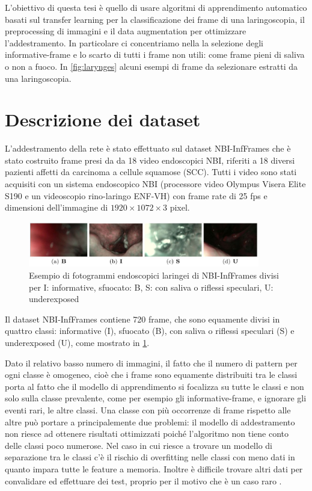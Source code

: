 L'obiettivo di questa tesi è quello di usare algoritmi di apprendimento automatico basati sul transfer learning per la classificazione dei frame di una laringoscopia, il  preprocessing di immagini e il data augmentation per ottimizzare l'addestramento. In particolare ci concentriamo nella la selezione degli informative-frame e lo scarto di tutti i frame non utili: come frame pieni di saliva o non a fuoco. In \cref{fig:larynges} alcuni esempi di frame da selezionare estratti da una laringoscopia.

\section{Descrizione dei dataset}\label{descrizione-dei-dataset}

L'addestramento della rete è stato effettuato  sul dataset
NBI-InfFrames  che
è stato costruito frame presi da da 18 video endoscopici NBI, riferiti a
18 diversi pazienti affetti da carcinoma a cellule squamose
(SCC). Tutti i video sono stati acquisiti con un sistema endoscopico
NBI (processore video Olympus Visera Elite S190 e
un videoscopio rino-laringo ENF-VH) con frame rate di
25 fps e dimensioni dell'immagine di \(1920\times 1072\times 3\) pixel.

\begin{figure}[ht]
    \centering
    \includegraphics[width=0.9\textwidth]{introduzione/Larynge.jpg}
    \caption[Esempio di fotogrammi endoscopici laringei di NBI-InfFrames]{Esempio di fotogrammi endoscopici laringei di NBI-InfFrames divisi per I: informative, sfuocato: B, S: con
    saliva o riflessi speculari,
    U: underexposed}
    \label{fig:larynges-2}
\end{figure}

Il dataset NBI-InfFrames contiene 720 frame, che sono equamente divisi in quattro classi: informative (I), sfuocato (B), con saliva o riflessi speculari (S) e underexposed  (U), come mostrato in \cref{fig:larynges-2}. 

Dato il relativo basso numero di immagini, il fatto che il numero di pattern per ogni classe è omogeneo, cioè che i frame sono equamente distribuiti tra le classi porta al fatto che il modello di apprendimento si focalizza su tutte le classi e non solo sulla classe prevalente, come per esempio gli informative-frame, e ignorare gli eventi rari, le altre classi.
Una classe con più occorrenze di frame rispetto alle altre può portare a principalemente due problemi: il modello di addestramento non riesce ad ottenere risultati ottimizzati  poiché l'algoritmo non tiene conto delle classi poco numerose. Nel caso in cui riesce a trovare un modello di separazione tra le classi c'è il rischio di overfitting nelle classi con meno dati in quanto impara tutte le feature a memoria. Inoltre è difficile trovare altri dati per convalidare ed effettuare dei test, proprio per il motivo che è un caso raro \cite{chatterjee_deep_2018}.

